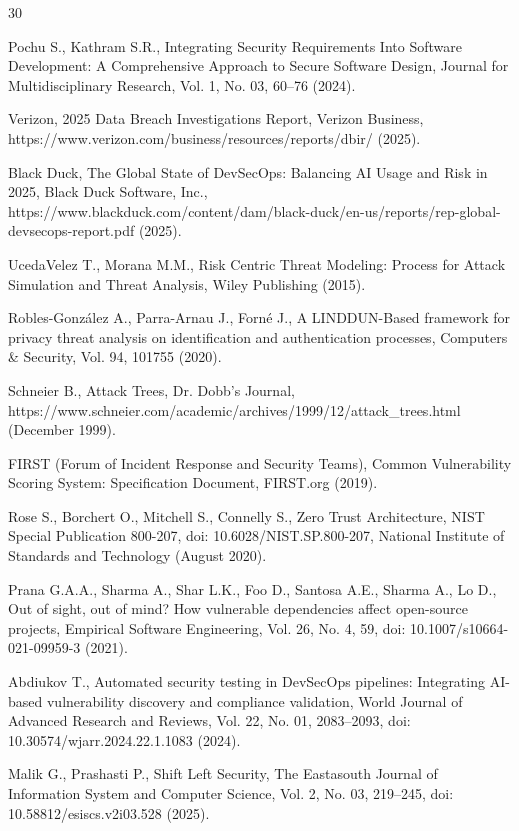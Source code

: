 \begin{thebibliography}{30}

Pochu S., Kathram S.R.,
Integrating Security Requirements Into Software Development: A Comprehensive Approach to Secure Software Design,
Journal for Multidisciplinary Research, Vol. 1, No. 03, 60--76 (2024).

Verizon,
2025 Data Breach Investigations Report,
Verizon Business, https://www.verizon.com/business/resources/reports/dbir/ (2025).

Black Duck,
The Global State of DevSecOps: Balancing AI Usage and Risk in 2025,
Black Duck Software, Inc., 
https://www.blackduck.com/content/dam/black-duck/en-us/reports/rep-global-devsecops-report.pdf (2025).

UcedaVelez T., Morana M.M.,
Risk Centric Threat Modeling: Process for Attack Simulation and Threat Analysis,
Wiley Publishing (2015).

Robles-González A., Parra-Arnau J., Forné J.,
A LINDDUN-Based framework for privacy threat analysis on identification and authentication processes,
Computers \& Security, Vol. 94, 101755 (2020).

Schneier B.,
Attack Trees,
Dr. Dobb's Journal, 
https://www.schneier.com/academic/archives/1999/12/attack\_trees.html (December 1999).

FIRST (Forum of Incident Response and Security Teams),
Common Vulnerability Scoring System: Specification Document,
FIRST.org (2019).

Rose S., Borchert O., Mitchell S., Connelly S.,
Zero Trust Architecture,
NIST Special Publication 800-207,
doi: 10.6028/NIST.SP.800-207,
National Institute of Standards and Technology (August 2020).

Prana G.A.A., Sharma A., Shar L.K., Foo D., Santosa A.E., Sharma A., Lo D.,
Out of sight, out of mind? How vulnerable dependencies affect open-source projects,
Empirical Software Engineering, Vol. 26, No. 4, 59,
doi: 10.1007/s10664-021-09959-3 (2021).

Abdiukov T.,
Automated security testing in DevSecOps pipelines: Integrating AI-based vulnerability discovery and compliance validation,
World Journal of Advanced Research and Reviews, Vol. 22, No. 01, 2083--2093,
doi: 10.30574/wjarr.2024.22.1.1083 (2024).

Malik G., Prashasti P.,
Shift Left Security,
The Eastasouth Journal of Information System and Computer Science, Vol. 2, No. 03, 219--245,
doi: 10.58812/esiscs.v2i03.528 (2025).

\end{thebibliography}
